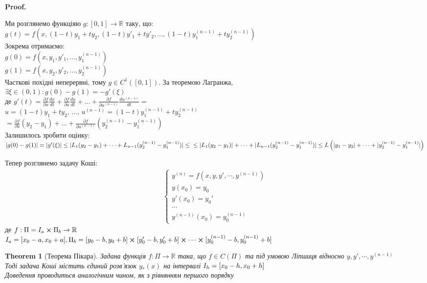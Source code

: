 \documentclass[a4paper, 10pt]{article}
\makeatletter
\def\qed{$\blacksquare$}
\theoremstyle{theoremdd}
\newtheorem{theorem}{Theorem}[subsection]
\theoremstyle{theoremdd}
\theoremstyle{theoremdd}
\theoremstyle{theoremdd}
\theoremstyle{theoremdd}
\theoremstyle{theoremdd}
\theoremstyle{theoremdd}
\theoremstyle{theoremdd}
\renewenvironment{proof}[1][Proof.\\]{\par
\pushQED{\hfill \qed}%
\normalfont \topsep6\p@\@plus6\p@\relax
\trivlist
\item\relax
{\bfseries
#1\@addpunct{.}}\hspace\labelsep\ignorespaces
}{%
\popQED\endtrivlist\@endpefalse
}
\makeatother
\begin{document}
	\begin{proof}
	Ми розглянемо функціяю $g: [0,1] \rightarrow \mathbb{R}$ таку, що:\\
	$\displaystyle g(t) = f(x, (1-t)y_1 + ty_2, (1-t)y'_1+ty'_2, \dots, (1-t)y^{(n-1)}_1+ty^{(n-1)}_2)$\\
	Зокрема отримаємо:\\
	$g(0) = f(x,y_1, y'_1, \dots, y^{(n-1)}_1)$\\
	$g(1) = f(x,y_2, y'_2, \dots, y^{(n-1)}_2)$\\
	Часткові похідні неперервні, тому $g \in C^1([0,1])$. За теоремою Лагранжа,\\
	$\exists \xi \in (0,1): g(0) - g(1) = -g'(\xi)$\\
	де $\displaystyle g'(t) = \frac{\partial f}{\partial x} \frac{dx}{dt} +  \frac{\partial f}{\partial u} \frac{du}{dt} + \dots +  \frac{\partial f}{\partial u^{(n-1)}} \frac{du^{(n-1)}}{dt} \boxed{=}$\\
	$u = (1-t)y_1+ty_2$, $\dots$, $u^{(n-1)} = (1-t)y^{(n-1)}_1 + ty^{(n-1)}_2$\\
	$\displaystyle \boxed{=} \frac{\partial f}{\partial u} (y_2-y_1) + \dots +  \frac{\partial f}{\partial u^{(n-1)}} (y^{(n-1)}_2-y^{(n-1)}_1)$\\
	Залишилось зробити оцінку:\\
	$|g(0) - g(1)| = |g'(\xi)| \leq |L_1(y_2-y_1)+\dots+L_{n-1}(y^{(n-1)}_2-y^{(n-1)}_1)| \leq \\ \leq |L_1(y_2-y_1)| +\dots+ |L_{n-1}(y^{(n-1)}_2-y^{(n-1)}_1)| \leq L\left(|y_1-y_2|+\dots+|y^{(n-1)}_2-y^{(n-1)}_1|\right)$ 
\end{proof}
	
	Тепер розглянемо задачу Коші:
	\begin{align*}
	\begin{cases}
	\displaystyle y^{(n)} = f(x,y,y',\cdots,y^{(n-1)})\\
	y(x_0)=y_0\\
	y'(x_0) = y_0'\\
	\cdots\\
	y^{(n-1)}(x_0) = y_0^{(n-1)}
	\end{cases}
	\end{align*}
	де $f: \Pi = I_a \cross \Pi_b \rightarrow \mathbb{R}$\\
	$I_a = [x_0 - a, x_0 + a], \\ \Pi_b = [y_0 -b, y_0+b] \cross [y_0'-b,y_0'+b] \cross \cdots \cross [y_0^{(n-1)}-b, y_0^{(n-1)}+b]$
	
	\begin{theorem}[Теорема Пікара]
	Задана функція $f: \Pi \rightarrow \mathbb{R}$ така, що $f \in C(\Pi)$ та під умовою Ліпшиця відносно $y,y',\cdots,y^{(n-1)}$\\
	Тоді задача Коші містить єдиний розв'язок $y_*(x)$ на інтервалі $\\I_h = [x_0-h, x_0+h]$\\
	\textit{Доведення проводиться аналогічним чином, як з рівнянням першого порядку}
	\end{theorem}
	
\end{document}
